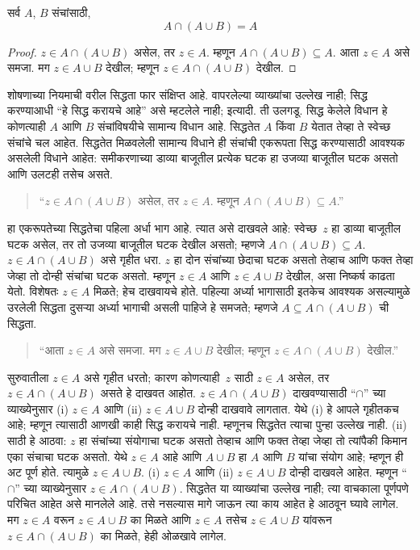 \begin{prop}[शोषणाचा नियम]
सर्व $A$, $B$ संचांसाठी,
\[
A \cap (A \cup B) = A
\]
\end{prop}

\begin{proof}
$z \in A \cap (A \cup B)$ असेल, तर $z \in A$. म्हणून $A \cap (A \cup B) \subseteq A$. आता $z \in A$ असे समजा. मग $z \in A \cup B$ देखील; म्हणून $z \in A \cap (A \cup B)$ देखील.
\end{proof}

शोषणाच्या नियमाची वरील सिद्धता फार संक्षिप्त आहे. वापरलेल्या व्याख्यांचा उल्लेख नाही; सिद्ध करण्याआधी “हे सिद्ध करायचे आहे” असे म्हटलेले नाही; इत्यादी. ती उलगडू. सिद्ध केलेले विधान हे कोणत्याही $A$ आणि $B$ संचांविषयीचे सामान्य विधान आहे. सिद्धतेत $A$ किंवा $B$ येतात तेव्हा ते स्वेच्छ संचांचे चल आहेत. सिद्धतेत मिळवलेली सामान्य विधाने ही संचांची एकरूपता सिद्ध करण्यासाठी आवश्यक असलेली विधाने आहेत: समीकरणाच्या डाव्या बाजूतील प्रत्येक घटक हा उजव्या बाजूतील घटक असतो आणि उलटही तसेच असते.

\begin{quote}
“$z \in A \cap (A \cup B)$ असेल, तर $z \in A$. म्हणून $A \cap (A \cup B) \subseteq A$.”
\end{quote}

हा एकरूपतेच्या सिद्धतेचा पहिला अर्धा भाग आहे. त्यात असे दाखवले आहे: स्वेच्छ~$z$ हा डाव्या बाजूतील घटक असेल, तर तो उजव्या बाजूतील घटक देखील असतो; म्हणजे $A \cap (A \cup B) \subseteq A$. $z \in A \cap (A \cup B)$ असे गृहीत धरा. $z$ हा दोन संचांच्या छेदाचा घटक असतो तेव्हाच आणि फक्त तेव्हा जेव्हा तो दोन्ही संचांचा घटक असतो. म्हणून $z \in A$ आणि $z \in A \cup B$ देखील, असा निष्कर्ष काढता येतो. विशेषतः $z \in A$ मिळते; हेच दाखवायचे होते. पहिल्या अर्ध्या भागासाठी इतकेच आवश्यक असल्यामुळे उरलेली सिद्धता दुसऱ्या अर्ध्या भागाची असली पाहिजे हे समजते; म्हणजे $A \subseteq A \cap (A \cup B)$ ची सिद्धता.

\begin{quote}
“आता $z \in A$ असे समजा. मग $z \in A \cup B$ देखील; म्हणून $z \in A \cap (A \cup B)$ देखील.”
\end{quote}

सुरुवातीला $z \in A$ असे गृहीत धरतो; कारण कोणत्याही~$z$ साठी $z \in A$ असेल, तर $z \in A \cap (A \cup B)$ असते हे दाखवत आहोत. $z \in A \cap (A \cup B)$ दाखवण्यासाठी “$\cap$” च्या व्याख्येनुसार (i) $z \in A$ आणि (ii) $z \in A \cup B$ दोन्ही दाखवावे लागतात. येथे (i) हे आपले गृहीतकच आहे; म्हणून त्यासाठी आणखी काही सिद्ध करायचे नाही. म्हणूनच सिद्धतेत त्याचा पुन्हा उल्लेख नाही. (ii) साठी हे आठवा: $z$ हा संचांच्या संयोगाचा घटक असतो तेव्हाच आणि फक्त तेव्हा जेव्हा तो त्यांपैकी किमान एका संचाचा घटक असतो. येथे $z \in A$ आहे आणि $A \cup B$ हा $A$ आणि $B$ यांचा संयोग आहे; म्हणून ही अट पूर्ण होते. त्यामुळे $z \in A \cup B$. (i) $z \in A$ आणि (ii) $z \in A \cup B$ दोन्ही दाखवले आहेत. म्हणून “$\cap$” च्या व्याख्येनुसार $z \in A \cap (A \cup B)$. सिद्धतेत या व्याख्यांचा उल्लेख नाही; त्या वाचकाला पूर्णपणे परिचित आहेत असे मानलेले आहे. तसे नसल्यास मागे जाऊन त्या काय आहेत हे आठवून घ्यावे लागेल. मग $z \in A$ वरून $z \in A \cup B$ का मिळते आणि $z \in A$ तसेच $z \in A \cup B$ यांवरून $z \in A \cap (A \cup B)$ का मिळते, हेही ओळखावे लागेल.

